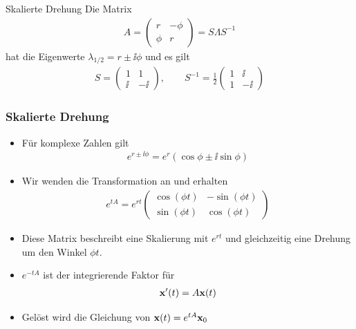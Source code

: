\begin{frame}
  \begin{block}{Skalierte Drehung}
    Die Matrix
    \begin{gather*}
      A =
      \begin{pmatrix}
        r & -\phi\\
        \phi & r
      \end{pmatrix} = S\Lambda S^{-1}
    \end{gather*}
    hat die Eigenwerte $\lambda_{1/2} = r \pm\ii\phi$ und es gilt
    \begin{gather*}
      S =
      \begin{pmatrix}
        1 & 1 \\ \ii & -\ii
      \end{pmatrix},\qquad
      S^{-1} = \frac12
      \begin{pmatrix}
        1 & \ii\\1 & -\ii
      \end{pmatrix}
    \end{gather*}
  \end{block}
\end{frame}

\begin{frame}
  \frametitle<presentation>{Skalierte Drehung}
  \begin{itemize}
  \item Für komplexe Zahlen gilt
    \begin{gather*}
      e^{r\pm\ii\phi} = e^r (\cos \phi\pm\ii\sin\phi)
    \end{gather*}
  \item Wir wenden die Transformation an und erhalten
    \begin{gather*}
      e^{tA} = e^{rt}
      \begin{pmatrix}
        \cos(\phi t) & -\sin(\phi t)\\
        \sin(\phi t) & \cos(\phi t)
      \end{pmatrix}
    \end{gather*}
  \item Diese Matrix beschreibt eine Skalierung mit $e^{rt}$ und
    gleichzeitig eine Drehung um den Winkel $\phi t$.
    \pause
  \item $e^{-tA}$ ist der integrierende Faktor für
    \begin{gather*}
      \mathbf{x}'(t) = A\mathbf{x}(t)
    \end{gather*}
    \item Gelöst wird die Gleichung von $\mathbf{x}(t) = e^{tA} \mathbf{x}_0$
  \end{itemize}
\end{frame}

